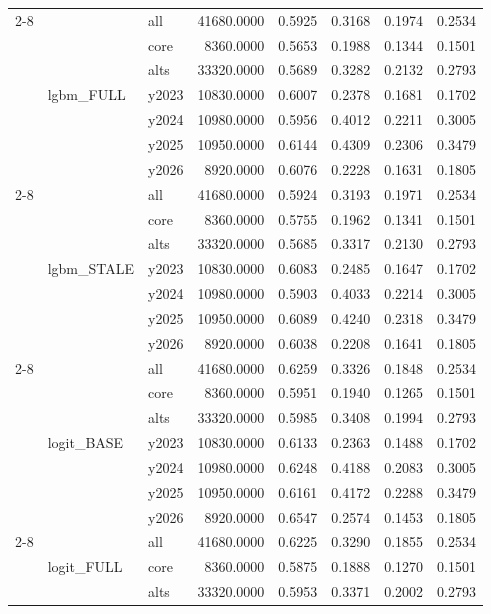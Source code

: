 \begin{tabular}{lllrrrrr}
\cline{2-8}
 & \multirow[t]{7}{*}{lgbm_FULL} & all & 41680.0000 & 0.5925 & 0.3168 & 0.1974 & 0.2534 \\
 &  & core & 8360.0000 & 0.5653 & 0.1988 & 0.1344 & 0.1501 \\
 &  & alts & 33320.0000 & 0.5689 & 0.3282 & 0.2132 & 0.2793 \\
 &  & y2023 & 10830.0000 & 0.6007 & 0.2378 & 0.1681 & 0.1702 \\
 &  & y2024 & 10980.0000 & 0.5956 & 0.4012 & 0.2211 & 0.3005 \\
 &  & y2025 & 10950.0000 & 0.6144 & 0.4309 & 0.2306 & 0.3479 \\
 &  & y2026 & 8920.0000 & 0.6076 & 0.2228 & 0.1631 & 0.1805 \\
\cline{2-8}
 & \multirow[t]{7}{*}{lgbm_STALE} & all & 41680.0000 & 0.5924 & 0.3193 & 0.1971 & 0.2534 \\
 &  & core & 8360.0000 & 0.5755 & 0.1962 & 0.1341 & 0.1501 \\
 &  & alts & 33320.0000 & 0.5685 & 0.3317 & 0.2130 & 0.2793 \\
 &  & y2023 & 10830.0000 & 0.6083 & 0.2485 & 0.1647 & 0.1702 \\
 &  & y2024 & 10980.0000 & 0.5903 & 0.4033 & 0.2214 & 0.3005 \\
 &  & y2025 & 10950.0000 & 0.6089 & 0.4240 & 0.2318 & 0.3479 \\
 &  & y2026 & 8920.0000 & 0.6038 & 0.2208 & 0.1641 & 0.1805 \\
\cline{2-8}
 & \multirow[t]{7}{*}{logit_BASE} & all & 41680.0000 & 0.6259 & 0.3326 & 0.1848 & 0.2534 \\
 &  & core & 8360.0000 & 0.5951 & 0.1940 & 0.1265 & 0.1501 \\
 &  & alts & 33320.0000 & 0.5985 & 0.3408 & 0.1994 & 0.2793 \\
 &  & y2023 & 10830.0000 & 0.6133 & 0.2363 & 0.1488 & 0.1702 \\
 &  & y2024 & 10980.0000 & 0.6248 & 0.4188 & 0.2083 & 0.3005 \\
 &  & y2025 & 10950.0000 & 0.6161 & 0.4172 & 0.2288 & 0.3479 \\
 &  & y2026 & 8920.0000 & 0.6547 & 0.2574 & 0.1453 & 0.1805 \\
\cline{2-8}
 & \multirow[t]{7}{*}{logit_FULL} & all & 41680.0000 & 0.6225 & 0.3290 & 0.1855 & 0.2534 \\
 &  & core & 8360.0000 & 0.5875 & 0.1888 & 0.1270 & 0.1501 \\
 &  & alts & 33320.0000 & 0.5953 & 0.3371 & 0.2002 & 0.2793 \\

\end{tabular}
